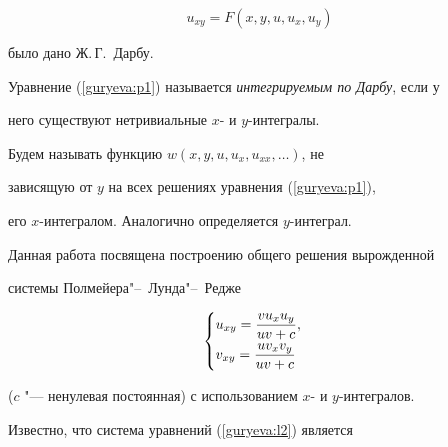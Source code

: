 \begin{equation} \label{guryeva:p1}


 u_{xy}=F(x, y, u, u_{x}, u_{y})


\end{equation}


было дано  Ж.\,Г.~Дарбу.


\begin{definition}


Уравнение (\ref{guryeva:p1}) называется {\it интегрируемым по Дарбу}, если у


него существуют нетривиальные $x$- и $y$-интегралы.


\end{definition}








Будем называть функцию $w(x, y, u, u_{x}, u_{xx}, \ldots)$, не


зависящую от $y$ на  всех решениях уравнения (\ref{guryeva:p1}),


его $x$-интегралом. Аналогично определяется $y$-интеграл.





Данная  работа  посвящена построению общего решения вырожденной


системы Полмейера"--~Лунда"--~Редже





\begin{equation} \label{guryeva:l2}


\begin{cases}


 \displaystyle u_{xy}=\frac{vu_{x}u_{y}}{uv+c}, \vspace{1mm}  \\


 \displaystyle v_{xy}=\frac{uv_{x}v_{y}}{uv+c}


\end{cases}


\end{equation}


($c$ "--- ненулевая постоянная)  с использованием $x$- и $y$-интегралов.







Известно, что система уравнений (\ref{guryeva:l2}) является


